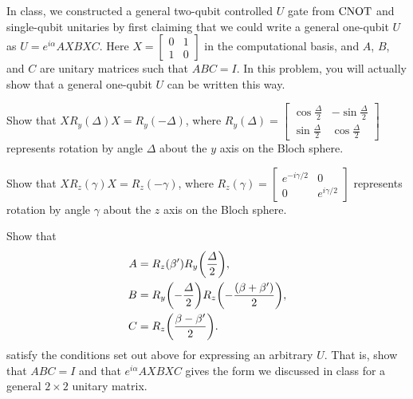\documentclass{../phys084}
\begin{document}
\begin{exercise}
  In class, we constructed a general two-qubit controlled \(U\) gate
  from \(\operatorname{CNOT}\) and single-qubit unitaries by first claiming that we
  could write a general one-qubit \(U\) as \(U = e^{i\alpha}AXBXC\).
  Here \(X =
  \begin{bmatrix}
    0 & 1 \\ 1 & 0
  \end{bmatrix}
  \) in the computational basis, and \(A\), \(B\), and \(C\) are
  unitary matrices such that \(ABC=I\).  In this problem, you will
  actually show that a general one-qubit \(U\) can be written this
  way.

  \begin{problems}
  \item Show that \(XR_y (\Delta) X = R_y (-\Delta)\), where
    \(R_y(\Delta) =
    \begin{bmatrix}
      \cos \frac \Delta 2 & -\sin \frac \Delta 2 \\
      \sin \frac \Delta 2 &  \cos \frac \Delta 2
    \end{bmatrix}
    \) represents rotation by angle \(\Delta\) about the \(y\) axis on
    the Bloch sphere.

  \item Show that \(XR_z(\gamma)X = R_z(-\gamma)\), where
    \(R_z(\gamma) =
    \begin{bmatrix}
      e^{-i\gamma/2} & 0 \\ 0 & e^{i\gamma/2}
    \end{bmatrix}
    \) represents rotation by angle \(\gamma\) about the \(z\) axis on
    the Bloch sphere.

  \item Show that
    \begin{align*}
      A &= R_z(\beta') R_y \prn*{\frac \Delta 2}, \\
      B &= R_y\prn*{-\frac \Delta 2} R_z\prn*{-\frac{(\beta+\beta')}{2}}, \\
      C &= R_z\prn*{\frac{\beta-\beta'}{2}}.
    \end{align*}
    satisfy the conditions set out above for expressing an arbitrary
    \(U\).  That is, show that \(ABC = I\) and that
    \(e^{i\alpha}AXBXC\) gives the form we discussed in class for a
    general \(2 \times 2\) unitary matrix.
  \end{problems}
\end{exercise}

\begin{solution}
  \begin{problems}
  \item
  \item
  \item
  \end{problems}
\end{solution}
\end{document}
